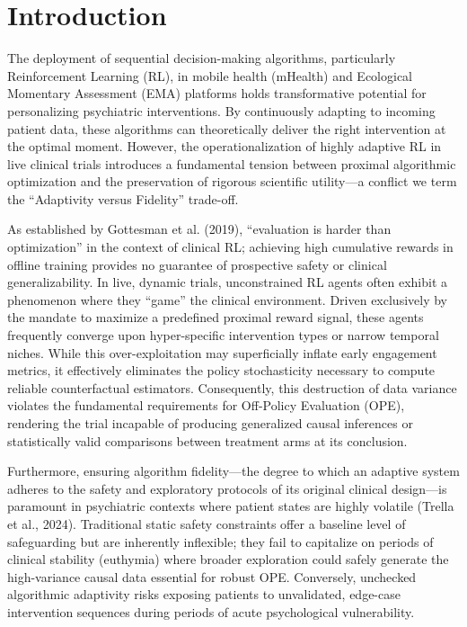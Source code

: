 \section{Introduction}

The deployment of sequential decision-making algorithms, particularly Reinforcement Learning (RL), in mobile health (mHealth) and Ecological Momentary Assessment (EMA) platforms holds transformative potential for personalizing psychiatric interventions. By continuously adapting to incoming patient data, these algorithms can theoretically deliver the right intervention at the optimal moment. However, the operationalization of highly adaptive RL in live clinical trials introduces a fundamental tension between proximal algorithmic optimization and the preservation of rigorous scientific utility—a conflict we term the ``Adaptivity versus Fidelity'' trade-off.

As established by Gottesman et al. (2019), ``evaluation is harder than optimization'' in the context of clinical RL; achieving high cumulative rewards in offline training provides no guarantee of prospective safety or clinical generalizability. In live, dynamic trials, unconstrained RL agents often exhibit a phenomenon where they ``game'' the clinical environment. Driven exclusively by the mandate to maximize a predefined proximal reward signal, these agents frequently converge upon hyper-specific intervention types or narrow temporal niches. While this over-exploitation may superficially inflate early engagement metrics, it effectively eliminates the policy stochasticity necessary to compute reliable counterfactual estimators. Consequently, this destruction of data variance violates the fundamental requirements for Off-Policy Evaluation (OPE), rendering the trial incapable of producing generalized causal inferences or statistically valid comparisons between treatment arms at its conclusion.

Furthermore, ensuring algorithm fidelity—the degree to which an adaptive system adheres to the safety and exploratory protocols of its original clinical design—is paramount in psychiatric contexts where patient states are highly volatile (Trella et al., 2024). Traditional static safety constraints offer a baseline level of safeguarding but are inherently inflexible; they fail to capitalize on periods of clinical stability (euthymia) where broader exploration could safely generate the high-variance causal data essential for robust OPE. Conversely, unchecked algorithmic adaptivity risks exposing patients to unvalidated, edge-case intervention sequences during periods of acute psychological vulnerability.

